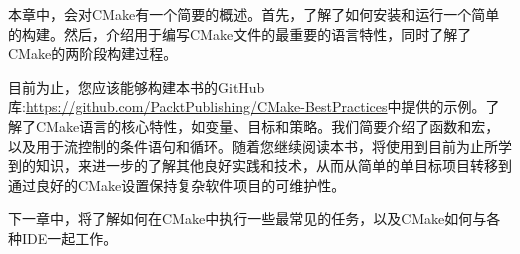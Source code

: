 本章中，会对CMake有一个简要的概述。首先，了解了如何安装和运行一个简单的构建。然后，介绍用于编写CMake文件的最重要的语言特性，同时了解了CMake的两阶段构建过程。

目前为止，您应该能够构建本书的GitHub库:\url{https://github.com/PacktPublishing/CMake-BestPractices}中提供的示例。了解了CMake语言的核心特性，如变量、目标和策略。我们简要介绍了函数和宏，以及用于流控制的条件语句和循环。随着您继续阅读本书，将使用到目前为止所学到的知识，来进一步的了解其他良好实践和技术，从而从简单的单目标项目转移到通过良好的CMake设置保持复杂软件项目的可维护性。

下一章中，将了解如何在CMake中执行一些最常见的任务，以及CMake如何与各种IDE一起工作。